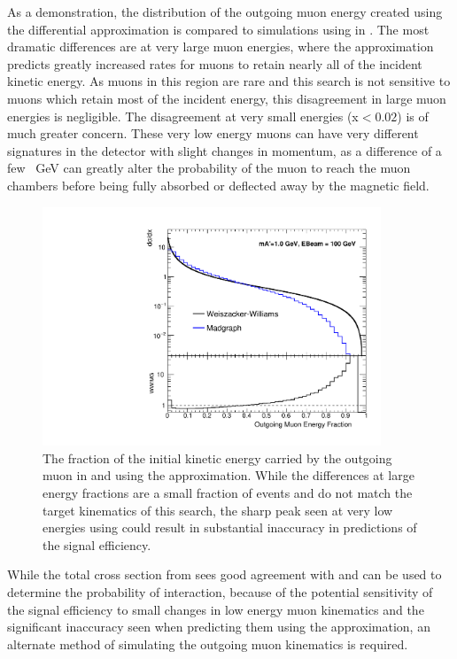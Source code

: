 As a demonstration, the distribution of the outgoing muon energy created using the differential \ww approximation is compared to simulations using \mg in . 
The most dramatic differences are at very large muon energies, where the \ww approximation predicts greatly increased rates for muons to retain nearly all of the incident kinetic energy.
As muons in this region are rare and this search is not sensitive to muons which retain most of the incident energy, this disagreement in large muon energies is negligible.
The disagreement at very small energies (x$<0.02$) is of much greater concern. 
These very low energy muons can have very different signatures in the detector with slight changes in momentum, as a difference of a few \SI{}{\giga\eV} can greatly alter the probability of the muon to reach the muon chambers before being fully absorbed or deflected away by the magnetic field.

\begin{figure}[ht]
	\includegraphics[width=0.9\textwidth]{figures/wwXcomp.pdf}
	\caption[\ww and \mg Outgoing Energy]{The fraction of the initial kinetic energy carried by the outgoing muon in \mg and using the \ww approximation. While the differences at large energy fractions are a small fraction of events and do not match the target kinematics of this search, the sharp peak seen at very low energies using \ww could result in substantial inaccuracy in predictions of the signal efficiency.}
	\label{fig:wwMgComp}
\end{figure}

While the total cross section from \ww sees good agreement with \mg and can be used to determine the probability of interaction, because of the potential sensitivity of the signal efficiency to small changes in low energy muon kinematics and the significant inaccuracy seen when predicting them using the \ww approximation, an alternate method of simulating the outgoing muon kinematics is required.


